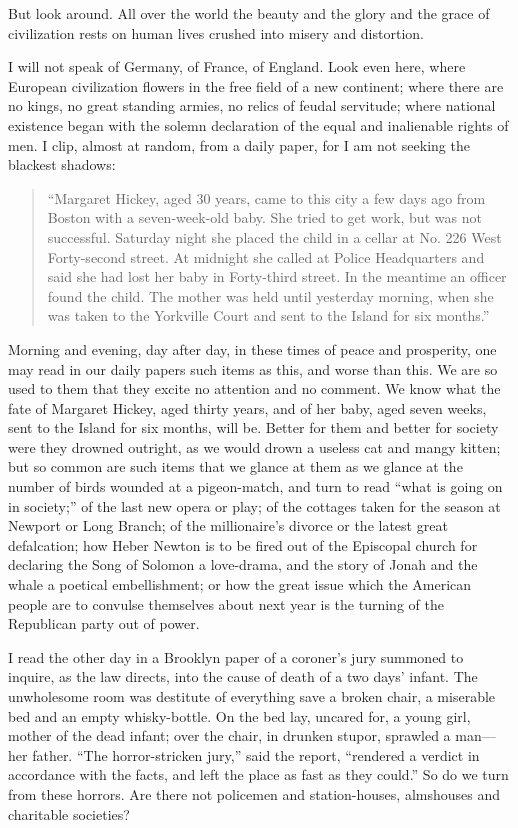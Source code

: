 \documentclass{book}
\begin{document}
But look around. All over the world the beauty and the glory and the grace of civilization rests on human lives crushed into misery and distortion.

I will not speak of Germany, of France, of England. Look even here, where European civilization flowers in the free field of a new continent; where there are no kings, no great standing armies, no relics of feudal servitude; where national existence began with the solemn declaration of the equal and inalienable rights of men. I clip, almost at random, from a daily paper, for I am not seeking the blackest shadows:

\begin{quotation}
	“Margaret Hickey, aged 30 years, came to this city a few days ago from Boston with a seven-week-old baby. She tried to get work, but was not successful. Saturday night she placed the child in a cellar at No. 226 West Forty-second street. At midnight she called at Police Headquarters and said she had lost her baby in Forty-third street. In the meantime an officer found the child. The mother was held until yesterday morning, when she was taken to the Yorkville Court and sent to the Island for six months.”
\end{quotation}

Morning and evening, day after day, in these times of peace and prosperity, one may read in our daily papers such items as this, and worse than this. We are so used to them that they excite no attention and no comment. We know what the fate of Margaret Hickey, aged thirty years, and of her baby, aged seven weeks, sent to the Island for six months, will be. Better for them and better for society were they drowned outright, as we would drown a useless cat and mangy kitten; but so common are such items that we glance at them as we glance at the number of birds wounded at a pigeon-match, and turn to read “what is going on in society;” of the last new opera or play; of the cottages taken for the season at Newport or Long Branch; of the millionaire’s divorce or the latest great defalcation; how Heber Newton is to be fired out of the Episcopal church for declaring the Song of Solomon a love-drama, and the story of Jonah and the whale a poetical embellishment; or how the great issue which the American people are to convulse themselves about next year is the turning of the Republican party out of power.

I read the other day in a Brooklyn paper of a coroner’s jury summoned to inquire, as the law directs, into the cause of death of a two days’ infant. The unwholesome room was destitute of everything save a broken chair, a miserable bed and an empty whisky-bottle. On the bed lay, uncared for, a young girl, mother of the dead infant; over the chair, in drunken stupor, sprawled a man—her father. “The horror-stricken jury,” said the report, “rendered a verdict in accordance with the facts, and left the place as fast as they could.” So do we turn from these horrors. Are there not policemen and station-houses, almshouses and charitable societies?
\end{document}
